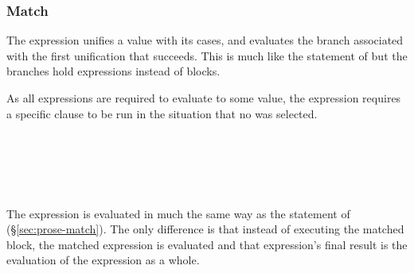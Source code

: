 \subsubsection{Match}

The  expression unifies a value with its cases, and evaluates the
branch associated with the first unification that succeeds. This is much
like the  statement of \Prose{} but the branches hold expressions
instead of blocks.

As all expressions are required to evaluate to some value, the 
expression requires a specific  clause to be run in the situation
that no  was selected.

\begin{bnf*}
     \\
     \\
     \\
     \\
\end{bnf*}

The  expression is evaluated in much the same way as the  statement of
\Prose{} (\S\ref{sec:prose-match}). The only difference is that instead of executing the
matched block, the matched expression is evaluated and that expression's final result is the
evaluation of the  expression as a whole.

\begin{prooftree}
\end{prooftree}

